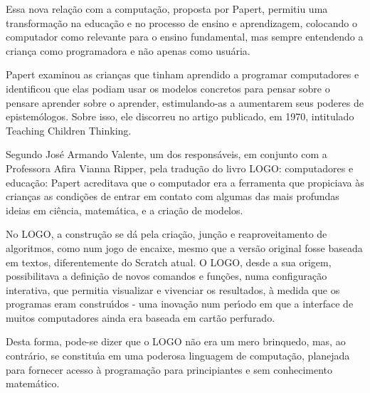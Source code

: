 \documentclass[
12pt,		%
openright,	%
twoside,  %
a4paper,			%
chapter=TITLE,		%
english,			%
french,				%
spanish,			%
brazil				%
]{USPSC-classe/USPSC_RedarTex}
\begin{document}
Essa nova rela\c{c}\~ao com a computa\c{c}\~ao, proposta por Papert, permitiu uma transforma\c{c}\~ao na educa\c{c}\~ao e no processo de ensino e aprendizagem, colocando o computador como relevante para o ensino fundamental, mas sempre entendendo a crian\c{c}a como programadora e n\~ao apenas como usu\'aria.








Papert examinou as crian\c{c}as que tinham aprendido a programar computadores e identificou que elas podiam usar os modelos concretos para \textquotedbl pensar sobre o pensar\textquotedbl  e \textquotedbl aprender sobre o aprender\textquotedbl  [XXX], estimulando-as  a aumentarem seus poderes de epistem\'ologos. Sobre isso, ele discorreu no artigo publicado, em 1970, intitulado Teaching Children Thinking.








Segundo Jos\'e Armando Valente, um dos respons\'aveis, em conjunto com a Professora Afira Vianna Ripper, pela tradu\c{c}\~ao do livro LOGO: computadores e educa\c{c}\~ao: \textquotedbl Papert acreditava que o computador era a ferramenta que propiciava \`as crian\c{c}as as condi\c{c}\~oes de entrar em contato com algumas das mais profundas ideias em ci\^encia, matem\'atica, e a cria\c{c}\~ao de modelos\textquotedbl .








No LOGO, a constru\c{c}\~ao se d\'a pela cria\c{c}\~ao, jun\c{c}\~ao e reaproveitamento de algoritmos, como num jogo de encaixe, mesmo que a vers\~ao original fosse baseada em textos, diferentemente do Scratch atual. O LOGO, desde a sua origem, possibilitava a defini\c{c}\~ao de novos comandos e fun\c{c}\~oes, numa configura\c{c}\~ao interativa, que permitia visualizar e vivenciar os resultados, \`a medida que os programas eram constru\'{\i}dos  - uma inova\c{c}\~ao num per\'{\i}odo em que a interface de muitos computadores ainda era baseada em cart\~ao perfurado.








Desta forma, pode-se dizer que o LOGO n\~ao era um mero brinquedo, mas, ao contr\'ario, se constitu\'{\i}a em uma poderosa linguagem de computa\c{c}\~ao, planejada para fornecer acesso \`a programa\c{c}\~ao para principiantes e sem conhecimento matem\'atico.
\end{document}
